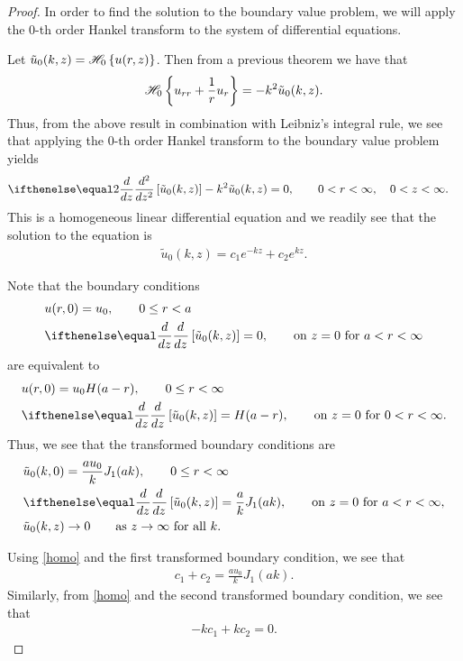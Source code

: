 \begin{proof}
  In order to find the solution to the boundary value problem, we will apply
  the 0-th order Hankel transform to the system of differential equations.

  Let $\tilde{u}_0(k, z) = \mathscr{H}_{ {0} }\left\{ {u(r, z)} \right\}$. Then
  from a previous theorem we have that
  \begin{align}\label{hankel0}
    \mathscr{H}_{ {0} }\left\{ {u_{rr} + \frac{1}{r}u_r} \right\} = -k^2 \tilde{u}_0(k, z).
  \end{align}
  Thus, from the above result in combination with Leibniz's integral rule, we see that
  applying the 0-th order Hankel transform to the boundary value problem yields
  \begin{align*}
    &\der{z}{2}\left[\tilde{u}_0(k, z)\right] - k^2 \tilde{u}_0(k, z) = 0, \qquad 0 < r < \infty, \quad 0 < z < \infty.
  \end{align*}
  This is a homogeneous linear differential equation and we readily see that
  the solution to the equation is
  \begin{align}\label{homo}
    \tilde{u}_0(k, z) = c_1 e^{-kz} + c_2 e^{kz}.
  \end{align}

  Note that the boundary conditions
  \begin{align*}
    &u(r, 0) = u_0, \qquad 0 \leq r < a \\
    &\der{z}{}\left[\tilde{u}_0(k, z)\right] = 0, \qquad \text{on $z=0$ for $a < r < \infty$}
  \end{align*}
  are equivalent to
  \begin{align*}
    &u(r, 0) = u_0H(a - r), \qquad 0 \leq r < \infty \\
    &\der{z}{}\left[\tilde{u}_0(k, z)\right] = H(a-r), \qquad \text{on $z=0$ for $0 < r < \infty$}.
  \end{align*}
  Thus, we see that the transformed boundary conditions are
  \begin{align*}
    &\tilde{u}_0(k, 0) = \frac{a u_0}{k}J_1(ak),\qquad 0 \leq r < \infty \\
    &\der{z}{}\left[\tilde{u}_0(k, z)\right] = \frac{a }{k}J_1(ak), \qquad \text{on $z=0$ for $a < r < \infty$},\\
    &\tilde{u}_0(k, z) \to 0 \qquad \text{as $z\to\infty$ for all $k$}.
  \end{align*}

  Using \eqref{homo} and the first transformed boundary condition, we see that
  \begin{align*}
    c_1 + c_2 = \frac{a u_0}{k}J_1(ak).
  \end{align*}
  Similarly, from \eqref{homo} and the second transformed boundary condition, we see that
  \begin{align*}
    -kc_1 + kc_2 = 0.
  \end{align*}
\end{proof}
\newpage
